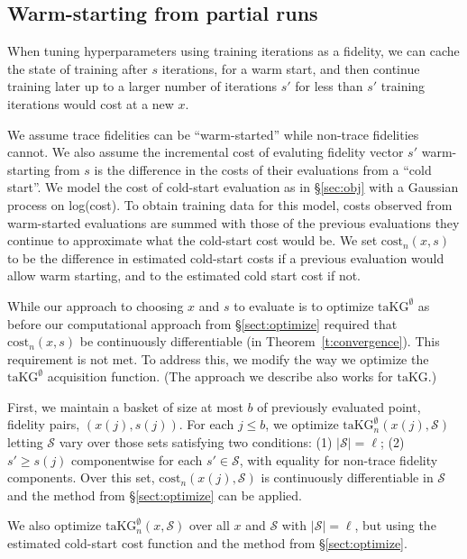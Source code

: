 \documentclass[letterpaper]{article}
\newcommand{\cost}{\text{cost}}
\newcommand{\taKG}{\text{taKG}}
\newcommand{\taKGE}{\text{taKG}^\emptyset}
\numberwithin{equation}{section}
\let\Section\S
\renewcommand{\S}{\mathcal{S}}
\newcommand{\sectn}[1]{\Section\ref{#1}}
\begin{document}
\subsection{Warm-starting from partial runs}
\label{sect:warm-start}
When tuning hyperparameters using training iterations as a fidelity,
we can cache the state of training after $s$ iterations, for a warm start, and then continue training later up to a larger number of iterations $s'$ for less than $s'$ training iterations would cost at a new $x$.

We assume trace fidelities can be ``warm-started'' while non-trace fidelities cannot.  We also assume the incremental cost of evaluting fidelity vector $s'$ warm-starting from $s$ is the difference in the costs of their evaluations from a ``cold start''.  We model the cost of cold-start evaluation as in \sectn{sec:obj} with a Gaussian process on log(cost).  To obtain training data for this model, costs observed from warm-started evaluations are summed with those of the previous evaluations they continue to approximate what the cold-start cost would be.  We set $\cost_n(x,s)$ to be the difference in estimated cold-start costs if a previous evaluation would allow warm starting, and to the estimated cold start cost if not.

While our approach to choosing $x$ and $s$ to evaluate is to optimize $\taKGE$ as before 
our computational approach from \sectn{sect:optimize} required that $\cost_n(x,s)$ be continuously differentiable (in Theorem~\ref{t:convergence}).  This requirement is not met.
To address this, we modify the way we optimize the $\taKGE$ acquisition function.
(The approach we describe also works for $\taKG$.)

First, we maintain a basket of size at most $b$ of previously evaluated point, fidelity pairs, $(x(j),s(j))$.
For each $j\le b$, we optimize $\taKGE_n(x(j),\S)$ letting $\S$ vary over those sets satisfying two conditions: (1) $|\S| = \ell$; 
(2) $s' \ge s(j)$ componentwise for each $s' \in \S$, 
with equality for non-trace fidelity components. 
Over this set, $\cost_n(x(j),\S)$ is continuously differentiable in $\S$ and the method from \sectn{sect:optimize} can be applied.


We also optimize $\taKGE_n(x,\S)$ over all $x$ and $\S$ with $|\S|=\ell$, but using the estimated cold-start cost function and the method from \sectn{sect:optimize}.
\end{document}
